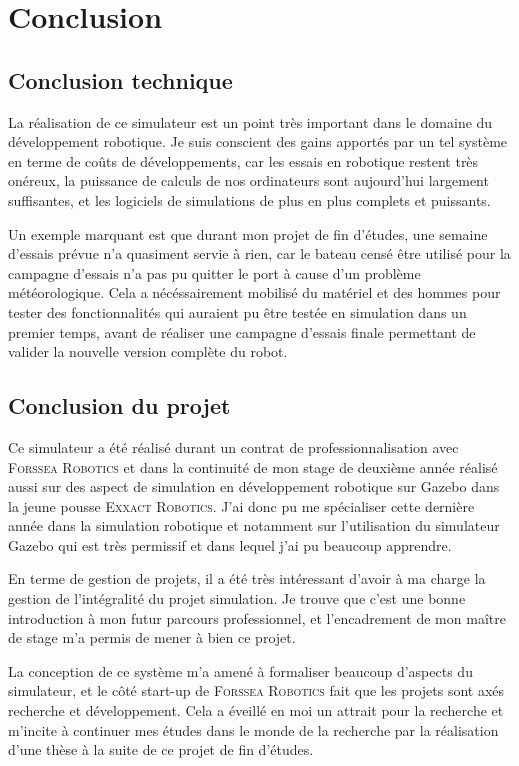 \chapter{Conclusion}
	\label{chapitre:conclusion}
	
	\section{Conclusion technique}

		La réalisation de ce simulateur est un point très important dans le domaine du développement robotique. Je suis conscient des gains apportés par un tel système en terme de coûts de développements, car les essais en robotique restent très onéreux, la puissance de calculs de nos ordinateurs sont aujourd'hui largement suffisantes, et les logiciels de simulations de plus en plus complets et puissants. 
		
		Un exemple marquant est que durant mon projet de fin d'études, une semaine d'essais prévue n'a quasiment servie à rien, car le bateau censé être utilisé pour la campagne d'essais n'a pas pu quitter le port à cause d'un problème météorologique. Cela a nécéssairement mobilisé du matériel et des hommes pour tester des fonctionnalités qui auraient pu être testée en simulation dans un premier temps, avant de réaliser une campagne d'essais finale permettant de valider la nouvelle version complète du robot.
	
	\section{Conclusion du projet}

		Ce simulateur a été réalisé durant un contrat de professionnalisation avec \textsc{Forssea Robotics} et dans la continuité de mon stage de deuxième année réalisé aussi sur des aspect de simulation en développement robotique sur \gls{Gazebo} dans la jeune pousse \textsc{Exxact Robotics}. J'ai donc pu me spécialiser cette dernière année dans la simulation robotique et notamment sur l'utilisation du simulateur \gls{Gazebo} qui est très permissif et dans lequel j'ai pu beaucoup apprendre.

		En terme de gestion de projets, il a été très intéressant d'avoir à ma charge la gestion de l'intégralité du projet simulation. Je trouve que c'est une bonne introduction à mon futur parcours professionnel, et l'encadrement de mon maître de stage m'a permis de mener à bien ce projet.

		La conception de ce système m'a amené à formaliser beaucoup d'aspects du simulateur, et le côté start-up de \textsc{Forssea Robotics} fait que les projets sont axés recherche et développement. Cela a éveillé en moi un attrait pour la recherche et m'incite à continuer mes études dans le monde de la recherche par la réalisation d'une thèse à la suite de ce projet de fin d'études.